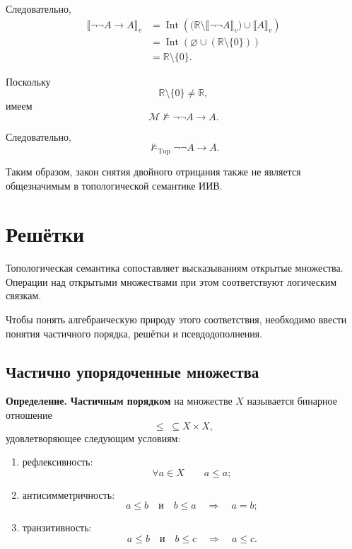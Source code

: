 \documentclass[12pt,a4paper,oneside,openany]{book}
\theoremstyle{definition}
\theoremstyle{plain}
\theoremstyle{remark}
\begin{document}
Следовательно,
\[
\begin{aligned}
\llbracket\neg\neg A\to A\rrbracket_v
&=
\operatorname{Int}
\left(
\bigl(
\mathbb R\setminus
\llbracket\neg\neg A\rrbracket_v
\bigr)
\cup
\llbracket A\rrbracket_v
\right)
\\
&=
\operatorname{Int}
\left(
\varnothing
\cup
(\mathbb R\setminus\{0\})
\right)
\\
&=
\mathbb R\setminus\{0\}.
\end{aligned}
\]

Поскольку
\[
\mathbb R\setminus\{0\}\neq\mathbb R,
\]
имеем
\[
\mathcal M\not\models\neg\neg A\to A.
\]

Следовательно,
\[
\not\models_{\mathrm{Top}}\neg\neg A\to A.
\]

Таким образом, закон снятия двойного отрицания также не является
общезначимым в топологической семантике ИИВ.





\section{Решётки}
Топологическая семантика сопоставляет высказываниям открытые множества.
Операции над открытыми множествами при этом соответствуют логическим
связкам.

Чтобы понять алгебраическую природу этого соответствия, необходимо
ввести понятия частичного порядка, решётки и псевдодополнения.

\subsection{Частично упорядоченные множества}

\textbf{Определение.}
\textbf{Частичным порядком} на множестве \(X\) называется бинарное
отношение
\[
\leq\;\subseteq X\times X,
\]
удовлетворяющее следующим условиям:

\begin{enumerate}
    \item рефлексивность:
          \[
          \forall a\in X
          \qquad
          a\leq a;
          \]

    \item антисимметричность:
          \[
          a\leq b
          \quad\text{и}\quad
          b\leq a
          \quad\Longrightarrow\quad
          a=b;
          \]

    \item транзитивность:
          \[
          a\leq b
          \quad\text{и}\quad
          b\leq c
          \quad\Longrightarrow\quad
          a\leq c.
          \]
\end{enumerate}
\end{document}
